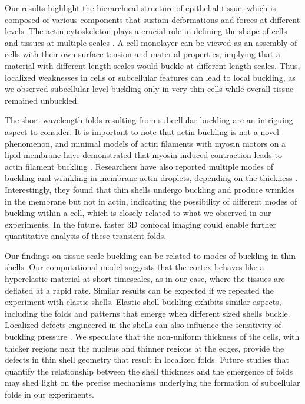 Our results highlight the hierarchical structure of epithelial tissue, which is composed of various components that sustain deformations and forces at different levels. The actin cytoskeleton plays a crucial role in defining the shape of cells and tissues at multiple scales \cite{clarke2021}. A cell monolayer can be viewed as an assembly of cells with their own surface tension and material properties, implying that a material with different length scales would buckle at different length scales. Thus, localized weaknesses in cells or subcellular features can lead to local buckling, as we observed subcellular level buckling only in very thin cells while overall tissue remained unbuckled.

The short-wavelength folds resulting from subcellular buckling are an intriguing aspect to consider. It is important to note that actin buckling is not a novel phenomenon, and minimal models of actin filaments with myosin motors on a lipid membrane have demonstrated that myosin-induced contraction leads to actin filament buckling \cite{murrell2012, costa2002,  wang2019}. Researchers have also reported multiple modes of buckling and wrinkling in membrane-actin droplets, depending on the thickness \cite{kusters2019}. Interestingly, they found that thin shells undergo buckling and produce wrinkles in the membrane but not in actin, indicating the possibility of different modes of buckling within a cell, which is closely related to what we observed in our experiments. In the future, faster 3D confocal imaging could enable further quantitative analysis of these transient folds.

Our findings on tissue-scale buckling can be related to modes of buckling in thin shells. Our computational model suggests that the cortex behaves like a hyperelastic material at short timescales, as in our case, where the tissues are deflated at a rapid rate. Similar results can be expected if we repeated the experiment with elastic shells. Elastic shell buckling exhibits similar aspects, including the folds and patterns that emerge when different sized shells buckle. Localized defects engineered in the shells can also influence the sensitivity of buckling pressure \cite{lee2016a}. We speculate that the non-uniform thickness of the cells, with thicker regions near the nucleus and thinner regions at the edges, provide the defects in thin shell geometry that result in localized folds. Future studies that quantify the relationship between the shell thickness and the emergence of folds may shed light on the precise mechanisms underlying the formation of subcellular folds in our experiments.

